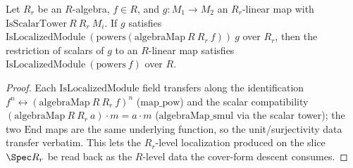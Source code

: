 \begin{lemma}
  \label{lem:isLocalizedModule_restrictScalars_powers_algebraMap}
  Let \(R_r\) be an \(R\)-algebra, \(f \in R\), and \(g : M_1 \to M_2\) an \(R_r\)-linear map with
  \(\mathrm{IsScalarTower}\ R\ R_r\ M_i\). If \(g\) satisfies
  \(\mathrm{IsLocalizedModule}\ (\mathrm{powers}(\mathrm{algebraMap}\ R\ R_r\ f))\ g\) over \(R_r\), then
  the restriction of scalars of \(g\) to an \(R\)-linear map satisfies
  \(\mathrm{IsLocalizedModule}\ (\mathrm{powers}\ f)\) over \(R\).
\end{lemma}
\begin{proof}
  Each \(\mathrm{IsLocalizedModule}\) field transfers along the identification
  \(f^n \leftrightarrow (\mathrm{algebraMap}\ R\ R_r\ f)^n\) (\(\mathrm{map\_pow}\)) and the scalar
  compatibility \((\mathrm{algebraMap}\ R\ R_r\ a)\cdot m = a \cdot m\) (\(\mathrm{algebraMap\_smul}\) via
  the scalar tower); the two \(\mathrm{End}\) maps are the same underlying function, so the unit/surjectivity
  data transfer verbatim. This lets the \(R_r\)-level localization produced on the slice
  \(\Spec R_r\) be read back as the \(R\)-level data the cover-form descent consumes.
\end{proof}

